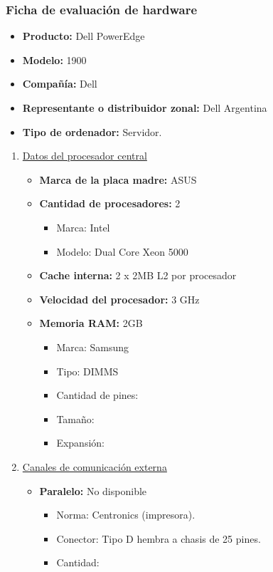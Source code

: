 \subsubsection{Ficha de evaluación de hardware}
\begin{itemize}
  \item \textbf{Producto:} Dell PowerEdge\texttrademark
  \item \textbf{Modelo:} 1900
  \item \textbf{Compañía:} Dell
  \item \textbf{Representante o distribuidor zonal:} Dell Argentina
  \item \textbf{Tipo de ordenador:} Servidor.
\end{itemize}

\begin{enumerate}

  \item \underline{Datos del procesador central}
  \begin{itemize}
    \item \textbf{Marca de la placa madre:} ASUS 
    
    \item \textbf{Cantidad de procesadores:} 2
    \begin{itemize}
      \item Marca: Intel
      \item Modelo: Dual Core Xeon 5000
    \end{itemize}
    
    \item \textbf{Cache interna:} 2 x 2MB L2 por procesador
    \item \textbf{Velocidad del procesador:} 3 GHz
    \item \textbf{Memoria RAM:} 2GB
    
    \begin{itemize}
      \item Marca: Samsung 
      \item Tipo: DIMMS
      \item Cantidad de pines: 
      \item Tamaño: 
      \item Expansión: 
    \end{itemize}
  \end{itemize}
  
  
  \item \underline{Canales de comunicación externa}
  \begin{itemize}
    \item \textbf{Paralelo:} No disponible 
    \begin{itemize}
      \item Norma: Centronics (impresora). 
      \item Conector: Tipo D hembra a chasis de 25 pines.
      \item Cantidad:
    \end{itemize}
    

\end{itemize}
\end{enumerate}
